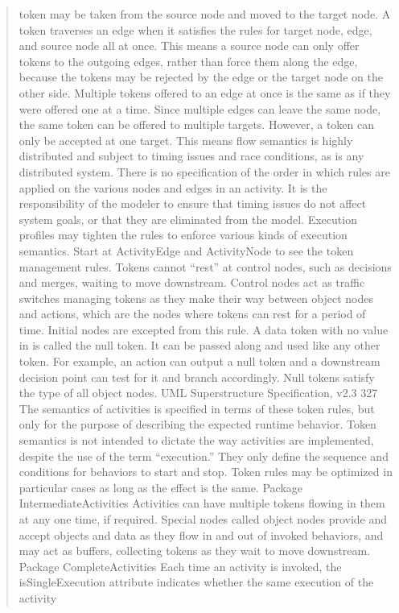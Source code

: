 \begin{quotation}
token may be taken from the source node and moved to the target node. A token traverses an edge when it satisfies the
rules for target node, edge, and source node all at once. This means a source node can only offer tokens to the outgoing
edges, rather than force them along the edge, because the tokens may be rejected by the edge or the target node on the
other side. Multiple tokens offered to an edge at once is the same as if they were offered one at a time. Since multiple
edges can leave the same node, the same token can be offered to multiple targets. However, a token can only be accepted
at one target. This means flow semantics is highly distributed and subject to timing issues and race conditions, as is any
distributed system. There is no specification of the order in which rules are applied on the various nodes and edges in an
activity. It is the responsibility of the modeler to ensure that timing issues do not affect system goals, or that they are
eliminated from the model. Execution profiles may tighten the rules to enforce various kinds of execution semantics. Start
at ActivityEdge and ActivityNode to see the token management rules.
Tokens cannot “rest” at control nodes, such as decisions and merges, waiting to move downstream. Control nodes act as
traffic switches managing tokens as they make their way between object nodes and actions, which are the nodes where
tokens can rest for a period of time. Initial nodes are excepted from this rule.
A data token with no value in is called the null token. It can be passed along and used like any other token. For example,
an action can output a null token and a downstream decision point can test for it and branch accordingly. Null tokens
satisfy the type of all object nodes.
UML Superstructure Specification, v2.3
327
The semantics of activities is specified in terms of these token rules, but only for the purpose of describing the expected
runtime behavior. Token semantics is not intended to dictate the way activities are implemented, despite the use of the
term “execution.” They only define the sequence and conditions for behaviors to start and stop. Token rules may be
optimized in particular cases as long as the effect is the same.
Package IntermediateActivities
Activities can have multiple tokens flowing in them at any one time, if required. Special nodes called object nodes
provide and accept objects and data as they flow in and out of invoked behaviors, and may act as buffers, collecting
tokens as they wait to move downstream.
Package CompleteActivities
Each time an activity is invoked, the isSingleExecution attribute indicates whether the same execution of the activity

\end{quotation}
